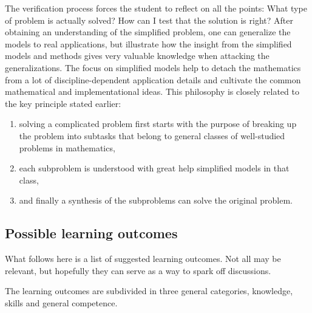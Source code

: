 \documentclass[%
oneside,                 %
final,                   %
10pt]{article}
\begin{document}
\noindent
The verification process forces the student to reflect on all the points: What type of problem is actually solved? How can I test that the solution is right?
After obtaining an understanding of the simplified problem, one can generalize the models to real applications, but illustrate how the insight from the simplified models and methods gives very valuable knowledge when attacking the generalizations. The focus on simplified models help to detach the mathematics from a lot of discipline-dependent application details and cultivate the common mathematical and implementational ideas.
This philosophy is closely related to the key principle stated earlier:
\begin{enumerate}
\item solving a complicated problem first starts with the purpose of breaking up the problem into subtasks that belong to general classes of well-studied problems in mathematics,

\item each subproblem is understood with great help simplified models in that class,

\item and finally a synthesis of the subproblems can solve the original problem.
\end{enumerate}

\noindent
\subsection{Possible learning outcomes}


What follows here is a list of suggested learning outcomes. Not all may be relevant, but hopefully they can serve as 
a way to spark off discussions.

The learning outcomes are subdivided in three general categories, knowledge, skills and general competence.
\end{document}
